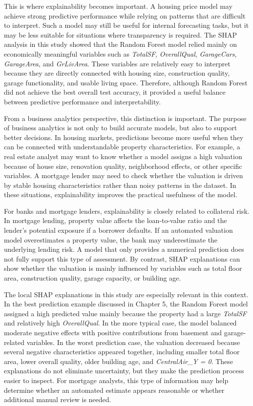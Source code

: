 \documentclass[12pt,a4paper,oneside,openany]{book}
\begin{document}
This is where explainability becomes important. A housing price model may achieve strong predictive performance while relying on patterns that are difficult to interpret. Such a model may still be useful for internal forecasting tasks, but it may be less suitable for situations where transparency is required. The SHAP analysis in this study showed that the Random Forest model relied mainly on economically meaningful variables such as \textit{TotalSF}, \textit{OverallQual}, \textit{GarageCars}, \textit{GarageArea}, and \textit{GrLivArea}. These variables are relatively easy to interpret because they are directly connected with housing size, construction quality, garage functionality, and usable living space. Therefore, although Random Forest did not achieve the best overall test accuracy, it provided a useful balance between predictive performance and interpretability.

From a business analytics perspective, this distinction is important. The purpose of business analytics is not only to build accurate models, but also to support better decisions. In housing markets, predictions become more useful when they can be connected with understandable property characteristics. For example, a real estate analyst may want to know whether a model assigns a high valuation because of house size, renovation quality, neighborhood effects, or other specific variables. A mortgage lender may need to check whether the valuation is driven by stable housing characteristics rather than noisy patterns in the dataset. In these situations, explainability improves the practical usefulness of the model.

For banks and mortgage lenders, explainability is closely related to collateral risk. In mortgage lending, property value affects the loan-to-value ratio and the lender's potential exposure if a borrower defaults. If an automated valuation model overestimates a property value, the bank may underestimate the underlying lending risk. A model that only provides a numerical prediction does not fully support this type of assessment. By contrast, SHAP explanations can show whether the valuation is mainly influenced by variables such as total floor area, construction quality, garage capacity, or building age.

The local SHAP explanations in this study are especially relevant in this context. In the best prediction example discussed in Chapter 5, the Random Forest model assigned a high predicted value mainly because the property had a large \textit{TotalSF} and relatively high \textit{OverallQual}. In the more typical case, the model balanced moderate negative effects with positive contributions from basement and garage-related variables. In the worst prediction case, the valuation decreased because several negative characteristics appeared together, including smaller total floor area, lower overall quality, older building age, and \textit{CentralAir\_Y = 0}. These explanations do not eliminate uncertainty, but they make the prediction process easier to inspect. For mortgage analysts, this type of information may help determine whether an automated estimate appears reasonable or whether additional manual review is needed.
\end{document}
